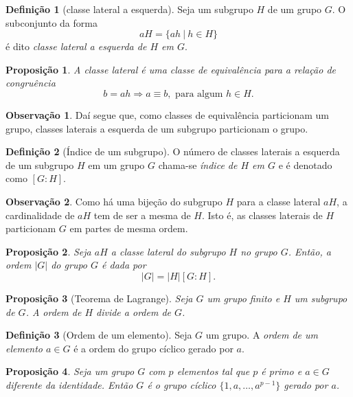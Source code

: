 \documentclass[a4paper,12pt]{report}
\theoremstyle{plain}
\newtheorem{proposicao}{Proposição}[section]
\theoremstyle{definition}
\newtheorem{definicao}{Definição}[section]
\newtheorem{observacao}{Observação}[section]
\begin{document}
	\begin{definicao}[classe lateral a esquerda]
		Seja um subgrupo \(H\) de um grupo \(G\). O
		subconjunto da forma \[aH = \{ah \ | \ h\in H\}\] é dito \emph{classe lateral a esquerda de \(H\) em \(G\)}.
	\end{definicao}
	
	\begin{proposicao}
		A classe lateral é uma classe de equivalência para a
		relação de congruência
		\[b = ah \Rightarrow a \equiv b, \text{ para algum } h\in H.\]	
	\end{proposicao}
	
	\begin{observacao}
		Daí segue que, como classes de equivalência particionam um grupo,
		classes laterais a esquerda de um subgrupo particionam o grupo.
	\end{observacao}
	
	\begin{definicao}[Índice de um subgrupo]
		O número de classes laterais a esquerda de um subgrupo
		\(H\) em um grupo \(G\) chama-se \emph{índice de \(H\) em \(G\)} e é
		denotado como \([G:H]\).	
	\end{definicao}
	
	\begin{observacao}
		Como há uma bijeção do subgrupo \(H\) para a classe lateral \(aH\), a
		cardinalidade de \(aH\) tem de ser a mesma de \(H\). Isto é, as
		classes laterais de \(H\) particionam \(G\) em partes de mesma ordem.
	\end{observacao}
	
	\begin{proposicao}
		Seja \(aH\) a classe lateral do subgrupo \(H\) no grupo
		\(G\). Então, a ordem \(|G|\) do grupo \(G\) é dada por
		\[|G| = |H|[G:H].\]	
	\end{proposicao}
	
	\begin{proposicao}[Teorema de Lagrange]
		Seja \(G\) um grupo finito e
		\(H\) um subgrupo de \(G\). A ordem de \(H\) divide a ordem de \(G\).
	\end{proposicao}
	
	\begin{definicao}[Ordem de um elemento]
		Seja \(G\) um grupo. A \emph{ordem de um elemento \(a\in G\)} é a ordem do grupo cíclico gerado por \(a\).	
	\end{definicao}
	
	\begin{proposicao}
		Seja um grupo \(G\) com \(p\) elementos tal que
		\(p\) é primo e \(a\in G\) diferente da identidade. Então \(G\) é o
		grupo cíclico \(\{1,a,\dots,a^{p-1}\}\) gerado por \(a\).
	\end{proposicao}
	
\end{document}
